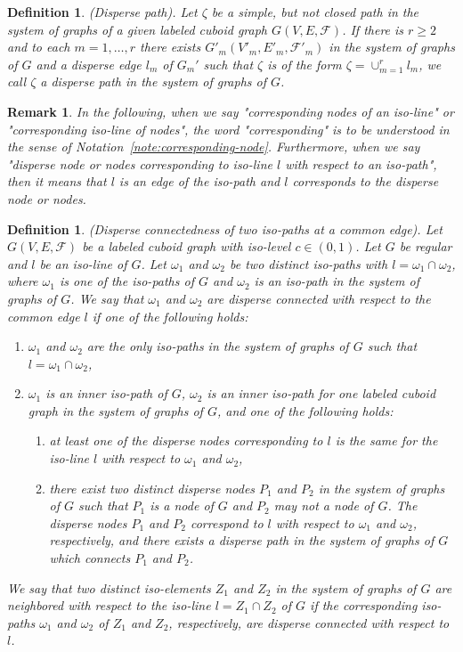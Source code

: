 \documentclass[a4paper,11pt]{article}
\newtheorem{definition}[theorem]{Definition}
\newtheorem{remark}[theorem]{Remark}
\begin{document}
\begin{definition}(Disperse path). Let $\zeta$ be a simple, but not closed path in the system of graphs
of a given labeled cuboid graph $G(V,E,\mathcal{F})$. If there is $r\geq 2$ and to each $m=1,\ldots,r$
there exists $G'_m(V'_m,E'_m,\mathcal{F}'_m)$ in the system of graphs of $G$ and a disperse edge $l_m$
of $G_m'$ such that $\zeta$ is of the form $\zeta=\cup_{m=1}^rl_m$, we call $\zeta$ a disperse path in
the system of graphs of $G$.
\label{def:disperse-path}
\end{definition}

\begin{remark}
In the following, when we say "corresponding nodes of an iso-line" or
"corresponding iso-line of nodes", the word "corresponding" is to be understood in the
sense of Notation~\ref{note:corresponding-node}. Furthermore, when we say "disperse
node or nodes corresponding to iso-line $l$ with respect to an iso-path", then it means that
$l$ is an edge of the iso-path and $l$ corresponds to the disperse node or nodes.
\label{rem:corresponding-node-line}
\end{remark}

\begin{definition}(Disperse connectedness of two iso-paths at a common edge). Let $G(V,E,\mathcal{F})$ be
a labeled cuboid graph with iso-level $c\in (0,1)$. Let $G$ be regular and $l$ be an iso-line of $G$.
Let $\omega_1$ and $\omega_2$ be two distinct iso-paths with $l=\omega_1\cap\omega_2$, where $\omega_1$
is one of the iso-paths of $G$ and $\omega_2$ is an iso-path in the system of graphs of $G$. We say that
$\omega_1$ and $\omega_2$ are disperse connected with respect to the common edge $l$ if one of the
following holds:
\begin{enumerate}
\item $\omega_1$ and $\omega_2$ are the only iso-paths in the system of graphs of $G$ such that
$l=\omega_1\cap\omega_2$,
\item $\omega_1$ is an inner iso-path of $G$, $\omega_2$ is an inner iso-path for one labeled cuboid
graph in the system of graphs of $G$, and one of the following holds:
\begin{enumerate}
\item at least one of the disperse nodes corresponding to $l$ is the same for the iso-line $l$ with
respect to $\omega_1$ and $\omega_2$,
\item there exist two distinct disperse nodes $P_1$ and $P_2$ in the system of graphs of $G$ such that
$P_1$ is a node of $G$ and $P_2$ may not a node of $G$. The disperse nodes $P_1$ and $P_2$ correspond
to $l$ with respect to $\omega_1$ and $\omega_2$, respectively, and there exists a disperse path in the
system of graphs of $G$ which connects $P_1$ and $P_2$.
\end{enumerate}
\end{enumerate}
We say that two distinct iso-elements $Z_1$ and $Z_2$ in the system of
graphs of $G$ are {\it neighbored} with respect to the iso-line $l=Z_1\cap Z_2$ of $G$ if the corresponding
iso-paths $\omega_1$ and $\omega_2$ of $Z_1$ and $Z_2$, respectively, are disperse connected with respect
to $l$.
\label{def:component-1}
\end{definition}
\end{document}
